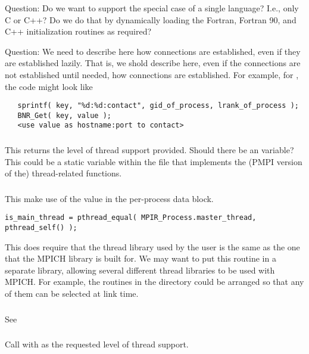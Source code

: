 \documentclass{article}
\begin{document}
Question: Do we want to support the special case of a single language?  I.e.,
only C or C++?  Do we do that by dynamically loading the Fortran, Fortran 90,
and C++ initialization routines as required?

Question:  We need to describe here how connections are established, even if
they are established lazily.  That is, we shold describe here, even if the
connections are not established until needed, how connections are
established.  For example, for \tcpname, the code might look like
\begin{verbatim}
   sprintf( key, "%d:%d:contact", gid_of_process, lrank_of_process );
   BNR_Get( key, value );
   <use value as hostname:port to contact>
\end{verbatim}

\subsubsection{}
This returns the level of thread support provided.  Should there be an
 variable?  This could be a static
variable within the file that implements the (PMPI version of the)
thread-related functions. 

\subsubsection{}
This make use of the  value in the
per-process data block.

\begin{verbatim}
is_main_thread = pthread_equal( MPIR_Process.master_thread, pthread_self() );
\end{verbatim}
This does require that the thread library used by the user is the same as the
one that the MPICH library is built for.  We may want to put this routine in a
separate library, allowing several different thread libraries to be used with
MPICH.  For example, the routines in the  directory could be
arranged so that any of them can be selected at link time.

\subsubsection{}
See 

\subsubsection{}
Call  with  as the
requested level of thread support.
\end{document}
